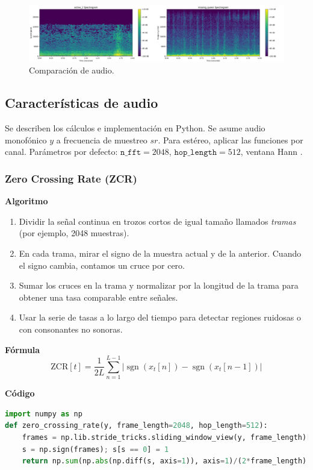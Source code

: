 \begin{figure}[!ht]
  \centering
  \includegraphics[width=\textwidth]{assets/cap_3/comparacion_audio.png}
  \caption{Comparación de audio.}
  \label{fig:comparacion_audio}
\end{figure}

\subsection{Características de audio}
Se describen los cálculos e implementación en Python. Se asume audio monofónico \(y\) a frecuencia de muestreo \(sr\). Para estéreo, aplicar las funciones por canal. Parámetros por defecto: \(\texttt{n\_fft}=2048\), \(\texttt{hop\_length}=512\), ventana Hann \parencite{mcfee2015librosa}.

\subsubsection{Zero Crossing Rate (ZCR)}
\textbf{Algoritmo} \parencite{rabiner2011tasdp, tzanetakis2002musical}
\begin{enumerate}
  \item Dividir la señal continua en trozos cortos de igual tamaño llamados \emph{tramas} (por ejemplo, 2048 muestras).
  \item En cada trama, mirar el signo de la muestra actual y de la anterior. Cuando el signo cambia, contamos un cruce por cero.
  \item Sumar los cruces en la trama y normalizar por la longitud de la trama para obtener una tasa comparable entre señales.
  \item Usar la serie de tasas a lo largo del tiempo para detectar regiones ruidosas o con consonantes no sonoras.
\end{enumerate}

\textbf{Fórmula}
\[
  \text{ZCR}[t]=\frac{1}{2L}\sum_{n=1}^{L-1}\big|\operatorname{sgn}(x_t[n])-\operatorname{sgn}(x_t[n-1])\big|
\]

\textbf{Código}
\begin{lstlisting}[language=Python, label={lst:zcr_code}, caption={ZCR por tramas}]
import numpy as np
def zero_crossing_rate(y, frame_length=2048, hop_length=512):
    frames = np.lib.stride_tricks.sliding_window_view(y, frame_length)[::hop_length]
    s = np.sign(frames); s[s == 0] = 1
    return np.sum(np.abs(np.diff(s, axis=1)), axis=1)/(2*frame_length)
\end{lstlisting}

